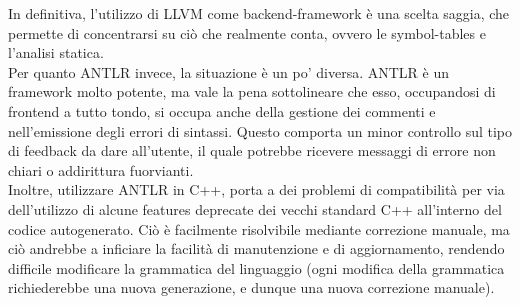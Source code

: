 In definitiva, l'utilizzo di LLVM come backend-framework è una scelta saggia, che permette di concentrarsi
su ciò che realmente conta, ovvero le symbol-tables e l'analisi statica. \\

Per quanto ANTLR invece, la situazione è un po' diversa. ANTLR è un framework molto potente, ma vale la pena 
sottolineare che esso, occupandosi di frontend a tutto tondo, si occupa anche della gestione dei commenti e nell'emissione
degli errori di sintassi. Questo comporta un minor controllo sul tipo di feedback da dare all'utente, il quale potrebbe
ricevere messaggi di errore non chiari o addirittura fuorvianti. \\

Inoltre, utilizzare ANTLR in C++, porta a dei problemi di compatibilità per via dell'utilizzo di alcune features 
deprecate dei vecchi standard C++ all'interno del codice autogenerato. Ciò è facilmente risolvibile mediante 
correzione manuale, ma ciò andrebbe a inficiare la facilità di manutenzione e di aggiornamento, rendendo difficile 
modificare la grammatica del linguaggio (ogni modifica della grammatica richiederebbe una nuova generazione, 
e dunque una nuova correzione manuale). \\

\newpage